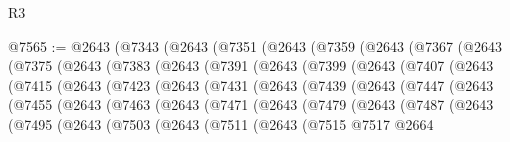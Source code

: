 \begin{lexlean}{R3}
\begin{coremodule}
@7565 := @2643
    (@7343
      (@2643
        (@7351
          (@2643
            (@7359
              (@2643
                (@7367
                  (@2643
                    (@7375
                      (@2643
                        (@7383
                          (@2643
                            (@7391
                              (@2643
                                (@7399
                                  (@2643
                                    (@7407
                                      (@2643
                                        (@7415
                                          (@2643
                                            (@7423
                                              (@2643
                                                (@7431
                                                  (@2643
                                                    (@7439
                                                      (@2643
                                                        (@7447
                                                          (@2643
                                                            (@7455
                                                              (@2643
                                                                (@7463
                                                                  (@2643
                                                                    (@7471
                                                                      (@2643
                                                                        (@7479
                                                                          (@2643
                                                                            (@7487
                                                                              (@2643
                                                                                (@7495
                                                                                  (@2643
                                                                                    (@7503
                                                                                      (@2643
                                                                                        (@7511
                                                                                          (@2643
                                                                                            (@7515
                                                                                              @7517
                                                                                              @2664

\end{coremodule}
\end{lexlean}
